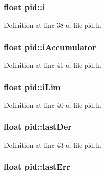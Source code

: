 \hypertarget{structpid_a97ebc09fc39d749940ebdc48926b8bb1}{
\subsubsection[{i}]{\setlength{\rightskip}{0pt plus 5cm}float {\bf pid\-::i}}}\label{structpid_a97ebc09fc39d749940ebdc48926b8bb1}


\-Definition at line 38 of file pid.\-h.

\hypertarget{structpid_afb7f8463c8cefe80b65db478c349a0b1}{
\subsubsection[{i\-Accumulator}]{\setlength{\rightskip}{0pt plus 5cm}float {\bf pid\-::i\-Accumulator}}}\label{structpid_afb7f8463c8cefe80b65db478c349a0b1}


\-Definition at line 41 of file pid.\-h.

\hypertarget{structpid_a2a3ee941dff64851693d27d04ece04f3}{
\subsubsection[{i\-Lim}]{\setlength{\rightskip}{0pt plus 5cm}float {\bf pid\-::i\-Lim}}}\label{structpid_a2a3ee941dff64851693d27d04ece04f3}


\-Definition at line 40 of file pid.\-h.

\hypertarget{structpid_ae79ee69d35b5daccddb71cbe270fbbd1}{
\subsubsection[{last\-Der}]{\setlength{\rightskip}{0pt plus 5cm}float {\bf pid\-::last\-Der}}}\label{structpid_ae79ee69d35b5daccddb71cbe270fbbd1}


\-Definition at line 43 of file pid.\-h.

\hypertarget{structpid_ab61187c1e1bf8e3f6b09501992bd744f}{
\subsubsection[{last\-Err}]{\setlength{\rightskip}{0pt plus 5cm}float {\bf pid\-::last\-Err}}}\label{structpid_ab61187c1e1bf8e3f6b09501992bd744f}


